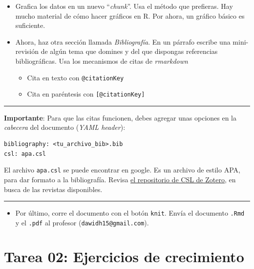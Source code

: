 \documentclass[12pt,letterpaper,]{book}
\providecommand{\tightlist}{%
  \setlength{\itemsep}{0pt}\setlength{\parskip}{0pt}}
\begin{document}
\begin{itemize}
\item
  Grafica los datos en un nuevo ``\emph{chunk}''. Usa el método que
  prefieras. Hay mucho material de cómo hacer gráficos en R. Por ahora,
  un gráfico básico es suficiente.
\item
  Ahora, haz otra sección llamada \emph{Bibliografía}. En un párrafo
  escribe una mini-revisión de algún tema que domines y del que
  dispongas referencias bibliográficas. Usa los mecanismos de citas de
  \emph{rmarkdown}

  \begin{itemize}
  \item
    Cita en texto con \texttt{@citationKey}
  \item
    Cita en paréntesis con \texttt{{[}@citationKey{]}}
  \end{itemize}
\end{itemize}

\begin{center}\rule{0.5\linewidth}{\linethickness}\end{center}

\textbf{Importante}: Para que las citas funcionen, debes agregar unas
opciones en la \emph{cabecera} del documento (\emph{YAML header}):

\begin{verbatim}
bibliography: <tu_archivo_bib>.bib
csl: apa.csl
\end{verbatim}

El archivo \texttt{apa.csl} se puede encontrar en google. Es un archivo
de estilo APA, para dar formato a la bibliografía. Revisa
\href{https://www.zotero.org/styles}{el repositorio de CSL de Zotero},
en busca de las revistas disponibles.

\begin{center}\rule{0.5\linewidth}{\linethickness}\end{center}

\begin{itemize}
\tightlist
\item
  Por último, corre el documento con el botón \texttt{knit}. Envía el
  documento \texttt{.Rmd} y el \texttt{.pdf} al profesor
  (\texttt{dawidh15@gmail.com}).
\end{itemize}

\newpage

\section{Tarea 02: Ejercicios de
crecimiento}\label{tarea-02-ejercicios-de-crecimiento}
\end{document}
